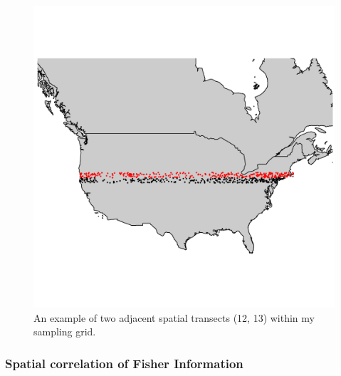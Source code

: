 \documentclass[12pt,twoside,openany]{reedthesis}
\begin{document}
\begin{figure}
\includegraphics[width=0.85\linewidth]{./chapterFiles/fisherSpatial/figures/figsCalledInDiss/transectSamplingEx_2rows} \caption{An example of two adjacent spatial transects (12, 13) within my sampling grid.}\label{fig:adjacentTsectEx}
\end{figure}
\subsubsection{Spatial correlation of Fisher
Information}\label{spatial-correlation-of-fisher-information}
\end{document}
